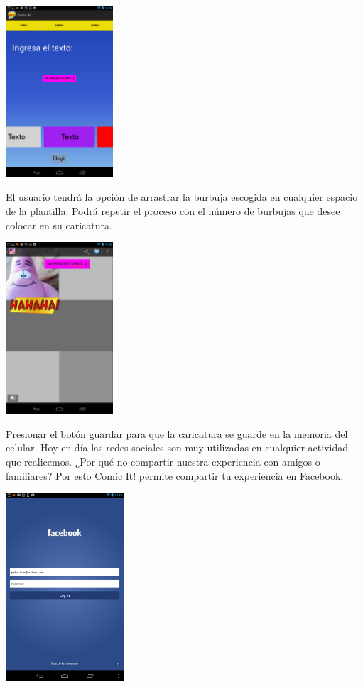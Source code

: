 \documentclass[12pt]{report}
\begin{document}
	\begin{center}
		\begingroup
			\includegraphics[width=0.30\textwidth]{imagenes_usuario/texto.png}
		\endgroup
	\end{center}



El usuario tendrá la opción de arrastrar la burbuja escogida en cualquier espacio de la plantilla. Podrá repetir el proceso con el número de burbujas que desee colocar en su caricatura.
\newline


	\begin{center}
		\begingroup
			\includegraphics[width=0.30\textwidth]{imagenes_usuario/comic.png}
		\endgroup
	\end{center}

Presionar el botón guardar para que la caricatura se guarde en la memoria del celular.
Hoy en día las redes sociales son muy utilizadas en cualquier actividad que realicemos. ¿Por qué no compartir nuestra experiencia con amigos o familiares?
Por esto Comic It! permite compartir tu experiencia en Facebook.
\newline

	\begin{center}
		\begingroup
			\includegraphics[width=0.33\textwidth]{imagenes_usuario/face.png}
		\endgroup
	\end{center}
\end{document}
